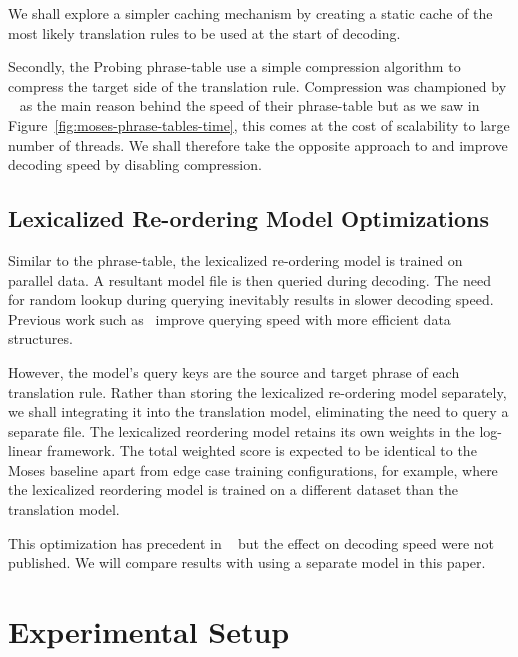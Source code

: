 \documentclass[11pt]{article}
\begin{document}
We shall explore a simpler caching mechanism by creating a static cache of the most likely translation rules to be used at the start of decoding.

Secondly, the Probing phrase-table use a simple compression algorithm to compress the target side of the translation rule. Compression was championed by ~ as the main reason behind the speed of their phrase-table but as we saw in Figure~\ref{fig:moses-phrase-tables-time}, this comes at the cost of scalability to large number of threads. We shall therefore take the opposite approach to and improve decoding speed by disabling compression.

\subsection{Lexicalized Re-ordering Model Optimizations}

Similar to the phrase-table, the lexicalized re-ordering model is trained on parallel data. A resultant model file is then queried during decoding. The need for random lookup during querying inevitably results in slower decoding speed. Previous work such as~ improve querying speed with more efficient data structures.

However, the model's query keys are the source and target phrase of each translation rule. Rather than storing the lexicalized re-ordering model separately, we shall integrating it into the translation model, eliminating the need to query a separate file. The lexicalized reordering model retains its own weights in the log-linear framework. The total weighted score is expected to be identical to the Moses baseline apart from edge case training configurations, for example, where the lexicalized reordering model is trained on a different dataset than the translation model.

This optimization has precedent in ~ but the effect on decoding speed were not published. We will compare results with using a separate model in this paper.

\section{Experimental Setup}
\label{sec:Experimental Setup}
\end{document}
